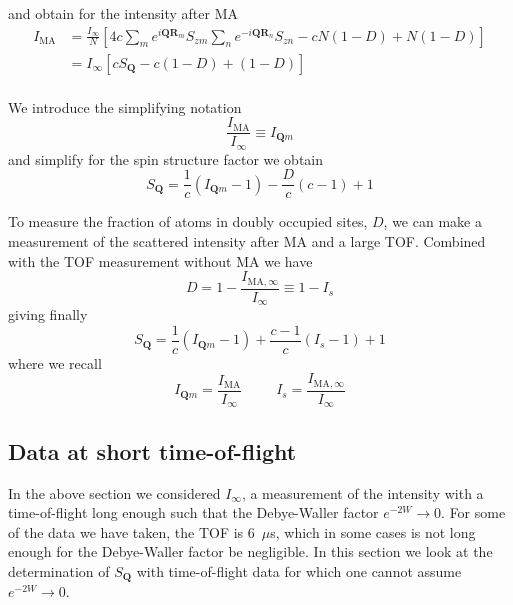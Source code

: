 \documentclass[11pt,letter]{article}
\newcommand{\bv}[1]{\ensuremath{\bm{#1}}}
\newcommand{\itof}{\ensuremath{I_{\infty} }}
\begin{document}
and obtain for the intensity after MA 
\begin{equation}
\begin{split} 
 I_{\text{MA}}  
&  = \frac{ \itof }{N} 
  \left[ 
      4 c \sum_{m}  
      e^{ i \bv{Q} \bv{R}_{m} } S_{zm} 
      \sum_{n } 
      e^{ -i \bv{Q} \bv{R}_{n} } S_{zn} 
    -  c N(1-D)  + N(1-D) 
   \right]  \\ 
&  =  \itof 
  \left[ c S_{\bv{Q}}
    -  c (1-D)  + (1-D) 
   \right]  \\ 
\end{split}
\end{equation}

We introduce the simplifying notation
\begin{equation}
 \frac{ I_{\mathrm{MA}} } { \itof } \equiv I_{\bv{Q}m} 
\end{equation}
and simplify for the spin structure factor we obtain 
\begin{equation}
S_{\bv{Q}} = \frac{1}{c}\left( I_{\bv{Q}m}  - 1 \right) 
             - \frac{D}{c}(c-1)  + 1 
\end{equation}

To measure the fraction of atoms in doubly occupied sites, $D$, we can make a
measurement of the scattered intensity after MA and a large TOF.  Combined with
the TOF measurement without MA we have 
\begin{equation}
  D = 1 - \frac{I_{\text{MA},\infty}}{ \itof } \equiv 1 - I_{s} 
\end{equation} 
giving finally 
\begin{equation}
S_{\bv{Q}} = \frac{1}{c}\left( I_{\bv{Q}m}  - 1 \right) 
            + \frac{c-1}{c}\left(  I_{s}   - 1\right)   + 1 
\end{equation}
where we recall 
\begin{equation}
 I_{\bv{Q}m} = \frac{ I_{\text{MA}}}{\itof}  
 \ \ \ \ \ \ \ \ \ \ \ 
 I_{s} = \frac{ I_{\text{MA},\infty} } {\itof} 
\end{equation}

\subsection{Data at short time-of-flight} 

In the above section we considered $\itof$, a measurement of the intensity with
a time-of-flight long enough such that the Debye-Waller factor $e^{-2W}
\rightarrow 0 $.   For some of the data we have taken, the TOF is 6~$\mu$s,
which in some cases is not long enough for the Debye-Waller factor be
negligible.  In this section we look at the determination of $S_{\bv{Q}}$ with
time-of-flight data for which one cannot assume $e^{-2W} \rightarrow 0 $.  
\end{document}
